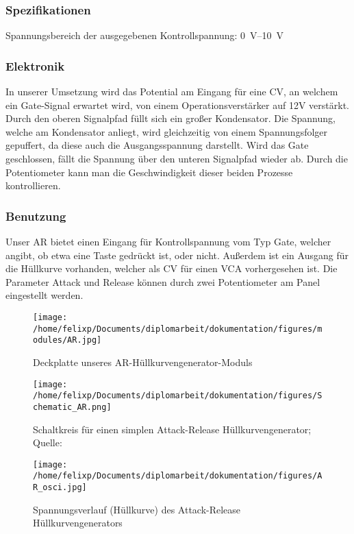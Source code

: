 \subsubsection{Spezifikationen}
\label{sec:orgcd396c1}
Spannungsbereich der ausgegebenen Kontrollspannung: \SIrange{0}{10}{\volt}

\subsubsection{Elektronik}
\label{sec:org8d77ff2}
In unserer Umsetzung wird das Potential am Eingang für eine \acl{CV}, an welchem ein Gate-Signal erwartet wird, von einem Operationsverstärker auf 12V verstärkt. Durch den oberen Signalpfad füllt sich ein großer Kondensator. Die Spannung, welche am Kondensator anliegt, wird gleichzeitig von einem Spannungsfolger gepuffert, da diese auch die Ausgangsspannung darstellt. Wird das Gate geschlossen, fällt die Spannung über den unteren Signalpfad wieder ab. Durch die Potentiometer kann man die Geschwindigkeit dieser beiden Prozesse kontrollieren.

\newpage

\subsubsection{Benutzung}
\label{sec:orga48ae72}
Unser AR bietet einen Eingang für Kontrollspannung vom Typ Gate, welcher angibt, ob etwa eine Taste gedrückt ist, oder nicht. Außerdem ist ein Ausgang für die Hüllkurve vorhanden, welcher als \acl{CV} für einen \ac{VCA} vorhergesehen ist. Die Parameter Attack und Release können durch zwei Potentiometer am Panel eingestellt werden.

\begin{figure}[hp]
\centering
\texttt{[image: /home/felixp/Documents/diplomarbeit/dokumentation/figures/modules/AR.jpg]}
\caption{Deckplatte unseres AR-Hüllkurvengenerator-Moduls}
\end{figure}

\newpage

\begin{figure}[hp]
\centering
\texttt{[image: /home/felixp/Documents/diplomarbeit/dokumentation/figures/Schematic\_AR.png]}
\caption{Schaltkreis für einen simplen Attack-Release Hüllkurvengenerator; Quelle: \cite{synthnerd:ar}}
\end{figure}

\begin{figure}[hp]
\centering
\texttt{[image: /home/felixp/Documents/diplomarbeit/dokumentation/figures/AR\_osci.jpg]}
\caption{\label{fig:org3ae8288}Spannungsverlauf (Hüllkurve) des Attack-Release Hüllkurvengenerators}
\end{figure}
